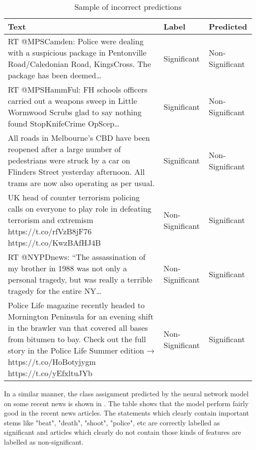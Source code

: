 \begin{table}
\begin{center}
\caption{Sample of incorrect predictions}
\label{tbl:incorrect_predictions}
\begin{tabular}{p{9cm}p{2.5cm}p{2.5cm}}
\toprule 
Text&Label&Predicted\\
\midrule 
RT @MPSCamden: Police were dealing with a suspicious package in Pentonville Road/Caledonian Road, KingsCross. The package has been deemed…&Significant&Non-Significant\\
\hline
RT @MPSHammFul: FH schools officers carried out a weapons sweep in Little Wormwood Scrubs glad to say nothing found StopKnifeCrime OpScep…&Significant&Non-Significant\\
\hline
All roads in Melbourne's CBD have been reopened after a large number of pedestrians were struck by a car on Flinders Street yesterday afternoon. All trams are now also operating as per usual.&Significant&Non-Significant\\
\hline
UK head of counter terrorism policing calls on everyone to play role in defeating terrorism and extremism https://t.co/rfVzB8jF76 https://t.co/KwzBAfHJ4B&Non-Significant&Significant\\
\hline
RT @NYPDnews: “The assassination of my brother in 1988 was not only a personal tragedy, but was really a terrible tragedy for the entire NY…&Non-Significant&Significant\\
\hline
Police Life magazine recently headed to Mornington Peninsula for an evening shift in the brawler van that covered all bases from bitumen to bay. Check out the full story in the Police Life Summer edition → https://t.co/HoBotyjygm https://t.co/yEfxltuJYb&Non-Significant&Significant\\
\bottomrule
\end{tabular}
\end{center}
\end{table}

In a similar manner, the class assignment predicted by the neural network model on some recent news  is shown in . The table shows that the model perform fairly good in the recent news articles. The statements which clearly contain important stems like "beat", "death", "shoot", "police", etc are correctly labelled as significant and articles which clearly do not contain those kinds of features are labelled as non-significant.

